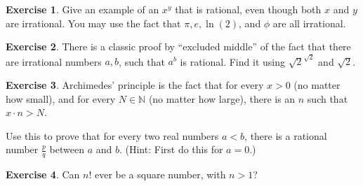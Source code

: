 \documentclass[11pt]{article}
\theoremstyle{definition}
\newtheorem{exercise}{Exercise}
\numberwithin{thm}{section}
\begin{document}
\begin{exercise} Give an example of an $x^y$ that is rational, even though both $x$ and $y$ are irrational. You may use the fact that $\pi, e, \ln(2)$, and $\phi$ are all irrational.
\end{exercise}

\begin{exercise} There is a classic proof by ``excluded middle'' of the fact that there are irrational numbers $a,b$, such that $a^b$ is rational. Find it using $\sqrt{2}^{\sqrt{2}}$ and $\sqrt{2}$.
\end{exercise}

\begin{exercise} Archimedes' principle is the fact that for every $x > 0$ (no matter how small), and for every $N \in \mathbb{N}$ (no matter how large), there is an $n$ such that $x\cdot n > N$.

Use this to prove that for every two real numbers $a < b$, there is a rational number $\frac{p}{q}$ between $a$ and $b$. (Hint: First do this for $a=0$.)
\end{exercise}

\begin{exercise} Can $n!$ ever be a square number, with $n>1$?
\end{exercise}
\end{document}
